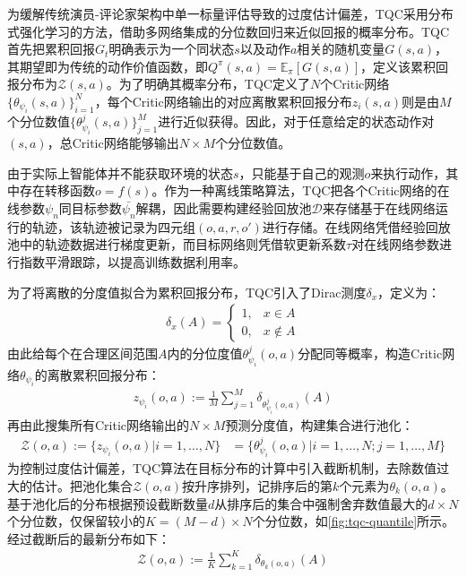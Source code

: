 为缓解传统演员-评论家架构中单一标量评估导致的过度估计偏差，TQC采用分布式强化学习的方法，借助多网络集成的分位数回归来近似回报的概率分布。TQC首先把累积回报$G_t$明确表示为一个同状态$s$以及动作$a$相关的随机变量$G(s,a)$，其期望即为传统的动作价值函数，即$Q^\pi(s,a) = \mathbb{E}_\pi[G(s,a)]$，定义该累积回报分布为$\mathcal{Z}(s,a)$。为了明确其概率分布，TQC定义了$N$个Critic网络$\{\theta_{\psi_i}(s,a)\}_{i=1}^N$，每个Critic网络输出的对应离散累积回报分布$z_i(s,a)$则是由$M$个分位数值$\{\theta_{\psi_i}^{j}(s,a)\}_{j=1}^M$进行近似获得。因此，对于任意给定的状态动作对$(s,a)$，总Critic网络能够输出$N \times M$个分位数值。

由于实际上智能体并不能获取环境的状态$s$，只能基于自己的观测$o$来执行动作，其中存在转移函数$o = f(s)$。作为一种离线策略算法，TQC把各个Critic网络的在线参数$\psi_n$同目标参数$\bar{\psi_n}$解耦，因此需要构建经验回放池$\mathcal{D}$来存储基于在线网络运行的轨迹，该轨迹被记录为四元组$(o, a, r, o')$进行存储。在线网络凭借经验回放池中的轨迹数据进行梯度更新，而目标网络则凭借软更新系数$\tau$对在线网络参数进行指数平滑跟踪，以提高训练数据利用率。

为了将离散的分度值拟合为累积回报分布，TQC引入了Dirac测度$\delta_x$，定义为：
\begin{align}
    \delta_x(A)=\left\{\begin{matrix}
        1, & x \in A\\
        0, & x \notin A
        \end{matrix}\right.
\end{align}
由此给每个在合理区间范围$A$内的分位度值$\theta_{\psi_i}^{j}(o,a)$分配同等概率，构造Critic网络$\theta_{\psi_i}$的离散累积回报分布：
\begin{align}
    z_{\psi_i}(o,a) := \frac{1}{M} \sum_{j=1}^M \delta_{\theta_{\psi_i}^{j}(o,a)}(A)
\end{align}
再由此搜集所有Critic网络输出的$N \times M$预测分度值，构建集合进行池化：
\begin{align}
    \mathcal{Z}(o,a) := \{z_{\psi_i}(o,a)|i=1,\ldots,N\} &= \{\theta_{\psi_i}^{j}(o,a)|i=1,\ldots,N; j=1,\ldots,M\}
\end{align}
为控制过度估计偏差，TQC算法在目标分布的计算中引入截断机制，去除数值过大的估计。把池化集合$\mathcal{Z}(o,a)$按升序排列，记排序后的第$k$个元素为$\theta_{k}(o,a)$。基于池化后的分布根据预设截断数量$d$从排序后的集合中强制舍弃数值最大的$d \times N$个分位数，仅保留较小的$K = (M - d) \times N$个分位数，如\cref{fig:tqc-quantile}所示。经过截断后的最新分布如下：
\begin{align}
    \mathcal{Z}(o,a) := \frac{1}{K} \sum_{k=1}^K \delta_{\theta_{k}(o,a)}(A)
\end{align}

